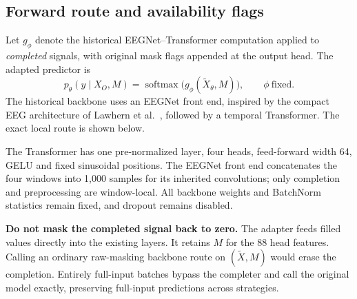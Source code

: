 \documentclass[11pt,a4paper]{article}
\begin{document}
\subsection{Forward route and availability flags}
Let $g_\phi$ denote the historical EEGNet--Transformer computation applied to
\emph{completed} signals, with original mask flags appended at the output head.
The adapted predictor is
\begin{equation}
 p_\theta(y\mid X_O,M)=\operatorname{softmax}
   \bigl(g_\phi(\widetilde X_\theta,M)\bigr),\qquad\phi\ \text{fixed}.
\end{equation}
The historical backbone uses an EEGNet front end, inspired by the compact EEG
architecture of Lawhern et al.\ \cite{eegnet}, followed by a temporal Transformer.
The exact local route is shown below.

\begin{center}
\end{center}
The Transformer has one pre-normalized layer, four heads, feed-forward width
64, GELU and fixed sinusoidal positions. The EEGNet front end concatenates the
four windows into 1,000 samples for its inherited convolutions; only completion
and preprocessing are window-local. All backbone weights and BatchNorm statistics
remain fixed, and dropout remains disabled.

\textbf{Do not mask the completed signal back to zero.} The adapter feeds filled
values directly into the existing layers. It retains $M$ for the 88 head features.
Calling an ordinary raw-masking backbone route on $(\widetilde X,M)$ would erase
the completion. Entirely full-input batches bypass the completer and call the
original model exactly, preserving full-input predictions across strategies.
\end{document}

